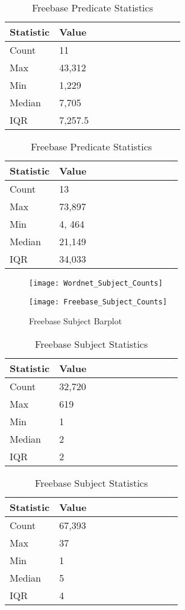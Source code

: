 \begin{table}[H]
	\parbox{.5\linewidth}{
		\caption{Wordnet Predicate Statistics}
		\centering
		\begin{tabular}{lllllllllll}
  			\textbf{Statistic} & \textbf{Value}  \\
  			\hline
			Count & 11 \\
			Max & 43,312  \\
			Min & 1,229  \\
  			Median & 7,705  \\
  			IQR & 7,257.5  \\
		\end{tabular}
		}
	\hfill
	\parbox{.5\linewidth}{
		\caption{Freebase Predicate Statistics}
		\centering
		\begin{tabular}{lllllllllll}
  			\textbf{Statistic} & \textbf{Value}  \\
  			\hline
			Count & 13 \\
			Max & 73,897  \\
			Min & 4, 464  \\
  			Median & 21,149  \\
  			IQR & 34,033  \\
		\end{tabular}
		}
\end{table}


\begin{figure}[H]
	\parbox{.5\linewidth}{
   		\caption{Wordnet Subject Barplot}
   		\centering
    		\texttt{[image: Wordnet\_Subject\_Counts]}
		}
	\hfill
	\parbox{.5\linewidth}{
		\caption{Freebase Subject Barplot}
   		\centering
		\texttt{[image: Freebase\_Subject\_Counts]}
		}
\end{figure}


\begin{table}[H]
	\parbox{.5\linewidth}{
		\caption{Wordnet Subject Statistics}
		\centering
		\begin{tabular}{lllllllllll}
  			\textbf{Statistic} & \textbf{Value}  \\
  			\hline
			Count & 32,720 \\
			Max & 619 \\
			Min & 1 \\
  			Median & 2 \\
  			IQR & 2 \\
		\end{tabular}
		}
	\hfill
	\parbox{.5\linewidth}{
		\caption{Freebase Subject Statistics}
		\centering
		\begin{tabular}{lllllllllll}
  			\textbf{Statistic} & \textbf{Value}  \\
  			\hline
			Count & 67,393 \\
			Max & 37 \\
			Min & 1 \\
  			Median & 5 \\
  			IQR & 4 \\
		\end{tabular}
		}
\end{table}

